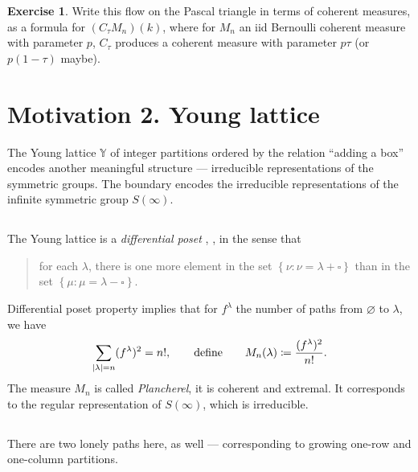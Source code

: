 \documentclass[letterpaper,11pt,oneside,reqno]{article}
\numberwithin{equation}{section}
\theoremstyle{definition}
\newtheorem{exercise}[proposition]{Exercise}
\begin{document}
\begin{exercise}
	Write this flow on the Pascal triangle in terms of coherent measures, as a formula for
	$(C_\tau M_n)(k)$, where for $M_n$ an iid Bernoulli coherent measure with parameter $p$, $C_\tau$ produces
	a coherent measure with parameter $p \tau$ (or $p(1-\tau)$ maybe).
\end{exercise}


\section{Motivation 2. Young lattice}

The Young lattice $\mathbb{Y}$ of integer partitions ordered
by the relation ``adding a box''
encodes another meaningful structure --- irreducible representations of the symmetric groups.
The boundary encodes the irreducible representations of the infinite symmetric group $S(\infty)$.

\subsection{}
The Young lattice is a \emph{differential poset} \cite{stanley1988differential},
\cite{fomin1994duality},
in the sense that
\begin{quote}
	for each $\lambda$, there is one more element in the set
	$\left\{ \nu\colon\nu=\lambda+\square \right\}$ than
	in the set $\left\{ \mu\colon\mu=\lambda-\square \right\}$.
\end{quote}
Differential poset
property implies that
for $f^\lambda$ the number of paths from $\varnothing$ to $\lambda$, we have
\begin{equation*}
	\sum_{|\lambda|=n}(f^\lambda)^2=n!, \qquad \textnormal{define}\qquad
	M_n(\lambda)\coloneqq\frac{(f^\lambda)^2}{n!}.
\end{equation*}
The measure $M_n$ is called \emph{Plancherel}, it is coherent
and extremal. It corresponds to the regular representation of $S(\infty)$,
which is irreducible.

\subsection{}

There are two lonely paths here, as well --- corresponding to growing
one-row and one-column partitions.

\subsection{}
\end{document}
